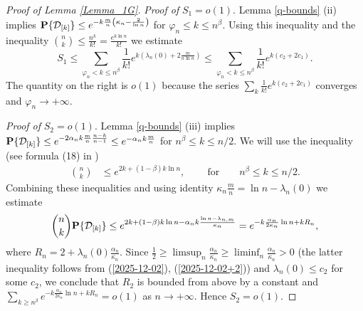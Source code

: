\documentclass[11pt, a4paper]{article}
\newcommand{\PP}{{\bf{P}}}
\begin{document}
\begin{proof}[Proof of Lemma \ref{Lemma_1G}]
{\it Proof of} $S_1=o(1)$. Lemma \ref{q-bounds} (ii) implies  
$
\PP\{{\cal D}_{[k]}\}
\le e^{-k\frac{m}{n}\left(\kappa_n-\frac{2}{\ln n}\right)}$ for $\varphi_n\le k\le n^{\beta}$.
Using this inequality and the inequality $\binom{n}{k}\le \frac{n^k}{k!}=\frac{e^{k\ln n}}{k!}$ we estimate
\begin{displaymath}
S_1
\le
\sum_{ \varphi_n< k\le n^{\beta}}
\frac{1}{k!}
e^{k
\left(
\lambda_{n}(0)+2\frac{m}{n\ln n}
\right)}
\le 
\sum_{ \varphi_n< k\le n^{\beta}}
\frac{1}{k!}
e^{k
(c_2+2c_1)}.
\end{displaymath}
The quantity on the right is $o(1)$ 
 because the series  $\sum_k\frac{1}{k!}
e^{k(c_2+2c_1)}$ converges 
and  $\varphi_n \to+\infty$. 


\bigskip

{\it Proof of} $S_2=o(1)$. 
Lemma \ref{q-bounds} (iii) implies  
$
\PP\{{\cal D}_{[k]}\}
\le 
e^{-2\alpha_nk\frac{m}{n}\frac{n-k}{n-1}}
\le e^{-\alpha_nk\frac{m}{n}}$ for 
$n^{\beta}\le k\le n/2$. 
We will use the inequality  (see formula (18) in \cite{Daumilas_Mindaugas2023})
\begin{align}
\label{2026-01-30}
\binom{n}{k}
&
\le 
e^{2k+(1-\beta)k\ln n},
\qquad
\
{\text{for}}
\qquad
n^{\beta}\le k\le n/2.
\end{align}
Combining these inequalities and using identity 
$\kappa_n\frac{m}{n}=\ln n-\lambda_{n}(0)$
we estimate
\begin{displaymath}
\binom{n}{k}
\PP\{{\cal D}_{[k]}\}
\le 
e^{2k+(1-\beta)k\ln n-\alpha_nk\frac{\ln n-\lambda_{n,m}}{\kappa_n}}
=
e^{-k\frac{\alpha_n}{2\kappa_n}\ln n+kR_n},
\end{displaymath}
where $R_n=2+\lambda_{n}(0)\frac{\alpha_n}{\kappa_n}$.
Since 
$\frac{1}{2}\ge \limsup_n\frac{\alpha_n}{\kappa_n}\ge \liminf_n\frac{\alpha_n}{\kappa_n}>0$ 
(the latter inequality follows from (\ref{2025-12-02}), (\ref{2025-12-02+2}))  and $\lambda_{n}(0)\le c_2$ for some $c_2$, we conclude that $R_2$ is bounded from above by a constant and
$\sum_{k\ge n^{\beta}} e^{-k\frac{\alpha_n}{2\kappa_n}\ln n+kR_n}=o(1)$ as $n\to+\infty$. Hence  
$S_2=o(1)$.
 \end{proof}
\end{document}
